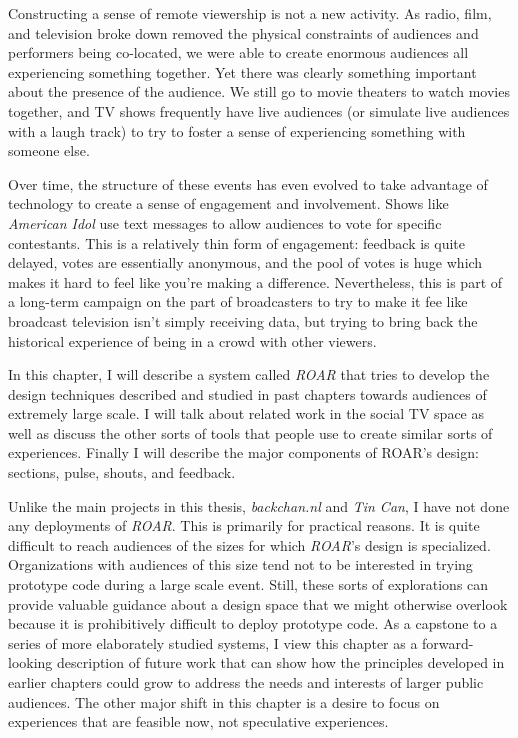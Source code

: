 Constructing a sense of remote viewership is not a new activity. As radio, film, and television broke down removed the physical constraints of audiences and performers being co-located, we were able to create enormous audiences all experiencing something together. Yet there was clearly something important about the presence of the audience. We still go to movie theaters to watch movies together, and TV shows frequently have live audiences (or simulate live audiences with a laugh track) to try to foster a sense of experiencing something with someone else.

Over time, the structure of these events has even evolved to take advantage of technology to create a sense of engagement and involvement. Shows like \emph{American Idol} use text messages to allow audiences to vote for specific contestants. This is a relatively thin form of engagement: feedback is quite delayed, votes are essentially anonymous, and the pool of votes is huge which makes it hard to feel like you're making a difference. Nevertheless, this is part of a long-term campaign on the part of broadcasters to try to make it fee like broadcast television isn't simply receiving data, but trying to bring back the historical experience of being in a crowd with other viewers.

In this chapter, I will describe a system called \emph{ROAR} that tries to develop the design techniques described and studied in past chapters towards audiences of extremely large scale. I will talk about related work in the social TV space as well as discuss the other sorts of tools that people use to create similar sorts of experiences. Finally I will describe the major components of ROAR's design: sections, pulse, shouts, and feedback. 

Unlike the main projects in this thesis, \emph{backchan.nl} and \emph{Tin Can}, I have not done any deployments of \emph{ROAR}. This is primarily for practical reasons. It is quite difficult to reach audiences of the sizes for which \emph{ROAR}'s design is specialized. Organizations with audiences of this size tend not to be interested in trying prototype code during a large scale event. Still, these sorts of explorations can provide valuable guidance about a design space that we might otherwise overlook because it is prohibitively difficult to deploy prototype code. As a capstone to a series of more elaborately studied systems, I view this chapter as a forward-looking description of future work that can show how the principles developed in earlier chapters could grow to address the needs and interests of larger public audiences. The other major shift in this chapter is a desire to focus on experiences that are feasible now, not speculative experiences. 

